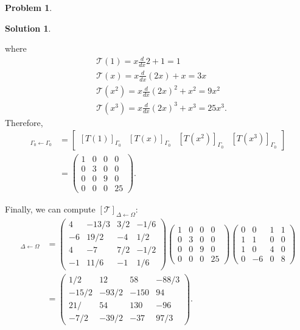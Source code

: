 \documentclass{book}
\theoremstyle{definition}
\newtheorem*{prob*}{Problem}
\newtheorem*{sln*}{Solution}
\newcommand{\T}{\mathcal{T}}
\begin{document}
\begin{prob*}
\begin{sln*}
\begin{enumerate}
\begin{enumerate}
				where
				\begin{align*}
				&\T(1) = x\frac{d}{dx}2 + 1 = 1\\
				&\T(x) = x\frac{d}{dx}(2x) + x = 3x\\
				&\T(x^2) = x\frac{d}{dx}(2x)^2 + x^2 = 9x^2\\
				&\T(x^3) = x\frac{d}{dx}(2x)^3 + x^3 = 25x^3.
				\end{align*}
				Therefore,
				\begin{align*}
				[\T]_{\Gamma_0\leftarrow\Gamma_0} &= \begin{bmatrix}
				[T(1)]_{\Gamma_0} & [T(x)]_{\Gamma_0} & [T(x^2)]_{\Gamma_0} & [T(x^3)]_{\Gamma_0}
				\end{bmatrix}\\
				&= \begin{pmatrix}
				1&0&0&0\\
				0&3&0&0\\
				0&0&9&0\\
				0&0&0&25
				\end{pmatrix}.
				\end{align*}
				
				Finally, we can compute $[\T]_{\Delta\leftarrow\Omega}$:
				\begin{align*}
				[\T]_{\Delta\leftarrow\Omega} &=     
				\begin{pmatrix}
				4&-13/3&3/2&-1/6\\
				-6&19/2&-4&1/2\\
				4&-7&7/2&-1/2\\
				-1&11/6&-1&1/6
				\end{pmatrix}
				\begin{pmatrix}
				1&0&0&0\\
				0&3&0&0\\
				0&0&9&0\\
				0&0&0&25
				\end{pmatrix}
				\begin{pmatrix}
				0&0&1&1\\
				1&1&0&0\\
				1&0&4&0\\
				0&-6&0&8
				\end{pmatrix}\\
				&= \begin{pmatrix}
				1/2&12&58&-88/3\\
				-15/2& -93/2& -150& 94\\
				21/& 54& 130& -96\\
				-7/2& -39/2& -37& 97/3
				\end{pmatrix}.
				\end{align*}
				

\end{enumerate}
\end{enumerate}
\end{sln*}
\end{prob*}
\end{document}
